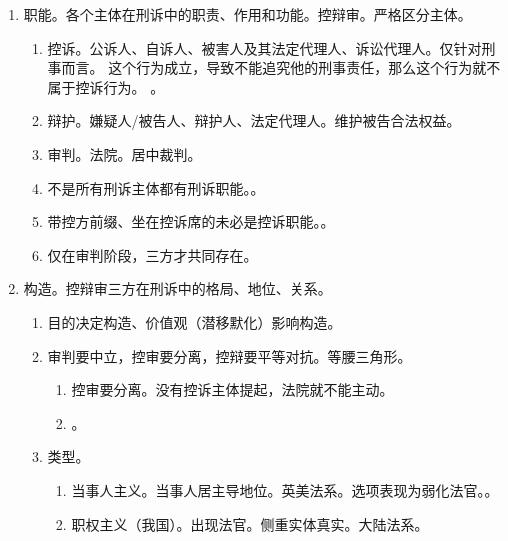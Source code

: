 \begin{enumerate}
\begin{enumerate}
\begin{enumerate}
\begin{enumerate}
                          \item 自诉。自诉人，被告人。
                          \item 附民。原告人，被告人。
                        \end{enumerate}
                  \item 其他诉讼参与人。法诉辩证翻鉴。法定代理人、诉讼代理人、辩护人、证人、翻译、鉴定人。
                \end{enumerate}
        \end{enumerate}
  \item 职能。各个主体在刑诉中的职责、作用和功能。控辩审。严格区分主体。
        \begin{enumerate}
          \item 控诉。公诉人、自诉人、被害人及其法定代理人、诉讼代理人。仅针对刑事而言。
                这个行为成立，导致不能追究他的刑事责任，那么这个行为就不属于控诉行为。
                。
          \item 辩护。嫌疑人/被告人、辩护人、法定代理人。维护被告合法权益。
          \item 审判。法院。居中裁判。
          \item 不是所有刑诉主体都有刑诉职能。。
          \item 带控方前缀、坐在控诉席的未必是控诉职能。。
          \item 仅在审判阶段，三方才共同存在。
        \end{enumerate}
  \item 构造。控辩审三方在刑诉中的格局、地位、关系。
        \begin{enumerate}
          \item 目的决定构造、价值观（潜移默化）影响构造。
          \item 审判要中立，控审要分离，控辩要平等对抗。等腰三角形。
                \begin{enumerate}
                  \item 控审要分离。没有控诉主体提起，法院就不能主动。
                  \item {}。
                \end{enumerate}
          \item 类型。
                \begin{enumerate}
                  \item 当事人主义。当事人居主导地位。英美法系。选项表现为弱化法官。。
                  \item 职权主义（我国）。出现法官。侧重实体真实。大陆法系。

\end{enumerate}
\end{enumerate}
\end{enumerate}

